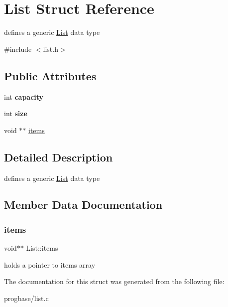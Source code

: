 \hypertarget{struct_list}{}\section{List Struct Reference}
\label{struct_list}


defines a generic \hyperlink{struct_list}{List} data type  




{\ttfamily \#include $<$list.\+h$>$}

\subsection*{Public Attributes}
\begin{DoxyCompactItemize}
\item 
\mbox{\label{struct_list_a2567251ca949168a0daf5794cf497fd5}} 
int {\bfseries capacity}
\item 
\mbox{\label{struct_list_ac41719eafdd551f0dcee8f3ce67ececc}} 
int {\bfseries size}
\item 
void $\ast$$\ast$ \hyperlink{struct_list_a200d7d33a9e1b63502a9403e11bfd45c}{items}
\end{DoxyCompactItemize}


\subsection{Detailed Description}
defines a generic \hyperlink{struct_list}{List} data type 

\subsection{Member Data Documentation}
\mbox{\label{struct_list_a200d7d33a9e1b63502a9403e11bfd45c}} 
\subsubsection{\texorpdfstring{items}{items}}
{\footnotesize\ttfamily void$\ast$$\ast$ List\+::items}

holds a pointer to items array 

The documentation for this struct was generated from the following file\+:\begin{DoxyCompactItemize}
\item 
progbase/list.\+c\end{DoxyCompactItemize}
